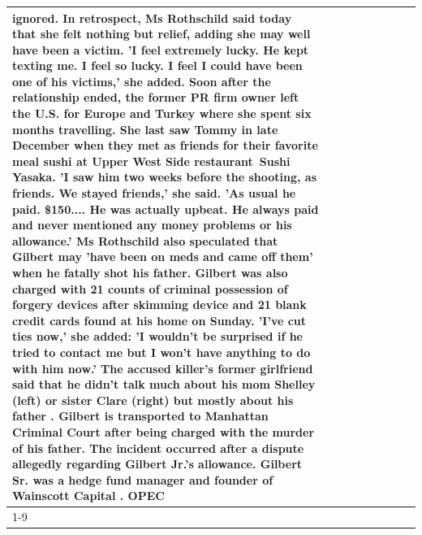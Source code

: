 \begin{table}[H]
\begin{tabular}{lllrlllll}
ignored. In retrospect, Ms Rothschild said today that she felt nothing but relief, adding she may well have been a victim. 'I feel extremely lucky. He kept texting me. I feel so lucky. I feel I could have been one of his victims,' she added. Soon after the relationship ended, the former PR firm owner left the U.S. for Europe and Turkey where she spent six months  travelling. She last saw Tommy in late December when they met as friends for their favorite meal sushi at Upper West Side restaurant Sushi Yasaka. 'I saw him two weeks before the shooting, as friends. We stayed friends,' she said. 'As usual he paid. \$150.... He was actually upbeat. He always paid and never mentioned any money problems or his allowance.' Ms Rothschild also speculated that Gilbert may 'have been on meds and came off them' when he fatally shot his father. Gilbert was also charged with 21 counts of criminal possession of forgery devices after skimming device and 21 blank credit cards found at his home on Sunday. 'I've cut ties now,' she added: 'I wouldn’t be surprised if he tried to contact me but I won’t have anything to do with him now.' The accused killer's former girlfriend said that he didn't talk much about his mom Shelley (left) or sister Clare (right) but mostly about his father . Gilbert is transported to Manhattan Criminal Court  after being charged with the murder of his father. The incident occurred after a dispute allegedly regarding Gilbert Jr.'s allowance. Gilbert Sr. was a hedge fund manager and founder of Wainscott Capital . OPEC \\
\cline{1-9}

\end{tabular}
\end{table}
